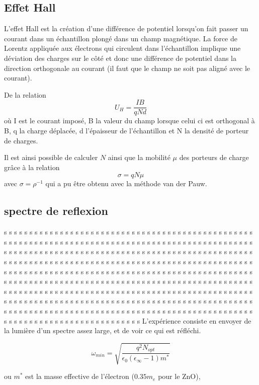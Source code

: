 \documentclass[a4paper,12pt,oneside]{article}
\def \be {\begin{equation}}
\def \ee {\end{equation}}
\begin{document}
\subsection{Effet Hall}
	L'effet Hall est la création d'une différence de potentiel lorsqu'on fait passer un courant dans un échantillon plongé dans un champ magnétique. La force de Lorentz appliquée aux électrons qui circulent dans l'échantillon implique une déviation des charges sur le côté et donc une différence de potentiel dans la direction orthogonale au courant (il faut que le champ ne soit pas aligné avec le courant).

	De la relation
	\be
		U_H = \frac{IB}{qNd}
	\ee
	où I est le courant imposé, B la valeur du champ lorsque celui ci est orthogonal à B, q la charge déplacée, d l'épaisseur de l'échantillon et N la densité de porteur de charges.

	Il est ainsi possible de calculer $N$ ainsi que la mobilité $\mu$ des porteurs de charge grâce à la relation
	\be
		\sigma = q N \mu
	\ee
	avec $\sigma=\rho^{-1}$ qui a pu être obtenu avec la méthode van der Pauw.

\subsection{spectre de reflexion}
s s s s s s s s s s s s s s s s s s s s s s s s s s s s s s s s s s s s s s s s s s s s s s s s s s s s s s s s s s s s s s s s s s s s s s s s s s s s s s s s s s s s s s s s s s s s s s s s s s s s s s s s s s s s s s s s s s s s s s s s s s s s s s s s s s s s s s s s s s s s s s s s s s s s s s s s s s s s s s s s s s s s s s s s s s s s s s s s s s s s s s s s s s s s s s s s s s s s s s s s s s s s s s s s s s s s s s s s s s s s s s s s s s s s s s s s s s s s s s s s s s s s s s s s s s s s s s s s s s s s s s s s s s s s s s s s s s s s s s s s s s s s s s s s s s s s s s s s s s s s s s s s s s s s s s s s s s s s s s s s s s s s s s s s s s s s s s s s s s s s s s s s s s s s s s s s s s s s s s s s s s s s s s s s s s s s s s s s s s s s s s s s s s s s s s s s s s s s s s s s s s s s s s s s s s s s s s s s s s s s s s s s s s s s s s s s s s s s s s s s s s s s s s s s s s s s s s s s s s s s s s s s s s s s 
L'expérience consiste en envoyer de la lumière d'un spectre assez large, et de voir ce qui est réfléchi.

\be
	\omega_{min}=\sqrt{ \frac{q^2 N_{opt}} {\epsilon_0(\epsilon_\infty-1)m^*} }
\ee

ou $m^*$ est la masse effective de l'électron ($0.35 m_e$ pour le ZnO),
\end{document}
